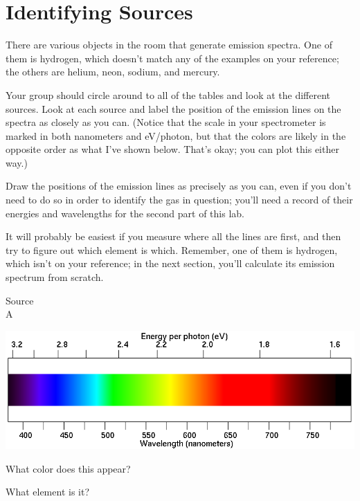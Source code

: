 \documentclass[11pt]{article}
\begin{document}
\section{Identifying Sources}

There are various objects in the room that generate emission spectra. One of them is hydrogen, which doesn't match any of the examples
on your reference; the others are helium, neon, sodium, and mercury.

Your group should circle around to all of the tables and look at the different sources. Look at each source and label the position of 
the emission lines on the spectra as closely as you can. (Notice that the scale in your spectrometer is marked in both nanometers and eV/photon, but that the colors are likely in the opposite order as what I've shown below. That's okay; you can plot this either way.) 

Draw the positions of the emission lines as precisely as you can, even if you don't need to do so in order
to identify the gas in question; you'll need a record of their energies and wavelengths for the second part of this lab.

It will probably be easiest if you measure where all the lines are first, and then try to figure out which
element is which. Remember, one of them is hydrogen, which isn't on your reference; in the next section, you'll calculate its emission spectrum from scratch.


\begin{minipage}{0.1\textwidth}
	\begin{center}
		\Large Source \\ A
	\end{center}
\end{minipage}
\begin{minipage}{0.8\textwidth}
	\includegraphics[width=\textwidth]{spectrum2.png}
\end{minipage}

\begin{minipage}{0.5\textwidth}
	What color does this appear?
\end{minipage}
\begin{minipage}{0.5\textwidth}
	What element is it?
\end{minipage}
\end{document}
